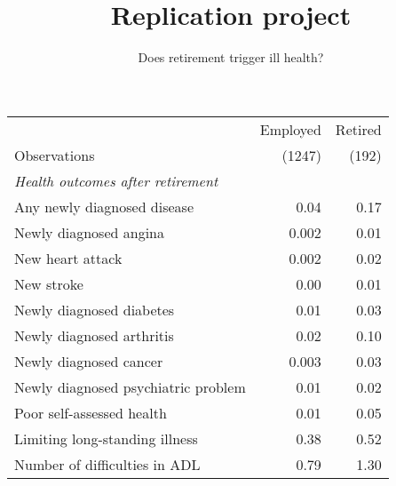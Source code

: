 \documentclass[12pt]{article}
\title{\vspace{-8ex} Replication project \vspace{-2ex}}
\author{Does retirement trigger ill health?}
\date{\vspace{-4ex}}
\begin{document}
\maketitle

\begin{tabular}{lrr}
    \toprule
    & Employed & Retired \\
    Observations & (1247) & (192) \\
    \midrule
    \textit{Health outcomes after retirement} & & \\
    Any newly diagnosed disease & 0.04 & 0.17 \\
    Newly diagnosed angina & 0.002 & 0.01 \\
    New heart attack & 0.002 & 0.02 \\
    New stroke & 0.00 & 0.01 \\
    Newly diagnosed diabetes & 0.01 & 0.03 \\
    Newly diagnosed arthritis & 0.02 & 0.10 \\
    Newly diagnosed cancer & 0.003 & 0.03 \\
    Newly diagnosed psychiatric problem & 0.01 & 0.02 \\
    Poor self-assessed health & 0.01 & 0.05 \\
    Limiting long-standing illness & 0.38 & 0.52 \\
    Number of difficulties in ADL & 0.79 & 1.30 \\
    \bottomrule
\end{tabular}    
\end{document}
